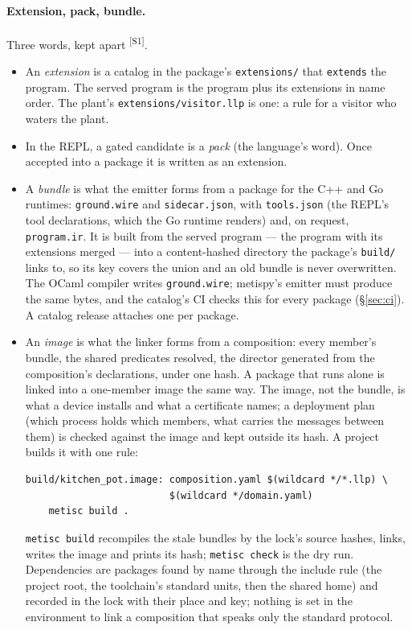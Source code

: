 \documentclass[11pt]{article}
\newcommand{\src}[1]{\textsuperscript{[#1]}}
\begin{document}
\paragraph{Extension, pack, bundle.} Three words, kept apart \src{S1}.
\begin{itemize}[nosep]
\item An \emph{extension} is a catalog in the package's
  \texttt{extensions/} that \texttt{extends} the program. The served
  program is the program plus its extensions in name order. The plant's
  \texttt{extensions/visitor.llp} is one: a rule for a visitor who waters
  the plant.
\item In the REPL, a gated candidate is a \emph{pack} (the language's
  word). Once accepted into a package it is written as an extension.
\item A \emph{bundle} is what the emitter forms from a package for the C++
  and Go runtimes: \texttt{ground.wire} and \texttt{sidecar.json}, with
  \texttt{tools.json} (the REPL's tool declarations, which the Go runtime
  renders) and, on request, \texttt{program.ir}. It is built from the
  served program --- the program with its extensions merged --- into a
  content-hashed directory the package's \texttt{build/} links to, so its
  key covers the union and an old bundle is never overwritten. The OCaml
  compiler writes \texttt{ground.wire}; metispy's emitter must produce the
  same bytes, and the catalog's CI checks this for every package
  (\S\ref{sec:ci}). A catalog release attaches one per package.
\item An \emph{image} is what the linker forms from a composition: every
  member's bundle, the shared predicates resolved, the director generated
  from the composition's declarations, under one hash. A package that
  runs alone is linked into a one-member image the same way. The image,
  not the bundle, is what a device installs and what a certificate names;
  a deployment plan (which process holds which members, what carries the
  messages between them) is checked against the image and kept outside
  its hash. A project builds it with one rule:
\begin{verbatim}
build/kitchen_pot.image: composition.yaml $(wildcard */*.llp) \
                         $(wildcard */domain.yaml)
	metisc build .
\end{verbatim}
  \texttt{metisc build} recompiles the stale bundles by the lock's source
  hashes, links, writes the image and prints its hash; \texttt{metisc
  check} is the dry run. Dependencies are packages found by name through
  the include rule (the project root, the toolchain's standard units,
  then the shared home) and recorded in the lock with their place and
  key; nothing is set in the environment to link a composition that
  speaks only the standard protocol.
\end{itemize}
\end{document}
